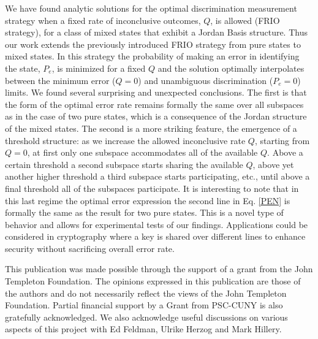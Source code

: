 \documentclass[aps,pra,twocolumn,eqsecnum,showpacs]{revtex4}
\begin{document}
We have found analytic solutions for the optimal discrimination measurement strategy when a fixed rate of inconclusive outcomes, $Q$, is allowed (FRIO strategy), for a class of mixed states that exhibit a Jordan Basis structure.  Thus our work extends the previously introduced FRIO strategy from pure states \cite{Bagan} to  mixed states. In this strategy the probability of making an error in identifying the state, $P_{e}$, is minimized for a fixed $Q$ and the solution optimally interpolates between the minimum error ($Q=0$) and unambiguous discrimination ($P_{e}=0$) limits.  We found several surprising and unexpected conclusions.  The first is that the form of the optimal error rate remains formally the same over all subspaces as in the case of two pure states, which is a consequence of the Jordan structure of the mixed states. The second is a more striking feature, the emergence of a threshold structure: as we increase the allowed inconclusive rate $Q$, starting from $Q=0$, at first only one subspace accommodates all of the available $Q$. Above a certain threshold a second subspace starts sharing the available $Q$, above yet another higher threshold a third subspace starts participating, etc., until above a final threshold all of the subspaces participate. It is interesting to note that in this last regime the optimal error expression the second line in Eq. \eqref{PEN} is formally the same as the result for two pure states.  This is a novel type of  behavior and allows for experimental tests of our findings. Applications could be considered in cryptography where a key is shared over different lines to enhance security without sacrificing overall error rate. 

\begin{acknowledgments}
This publication was made possible through the support of a grant from the John Templeton Foundation. The opinions expressed in this publication are those of the authors and do not necessarily reflect the
views of the John Templeton Foundation. Partial financial support by a Grant from PSC-CUNY is also gratefully acknowledged. We also acknowledge useful discussions on various aspects of this project with Ed Feldman, Ulrike Herzog and Mark Hillery.
\end{acknowledgments}
  


  
\end{document}
